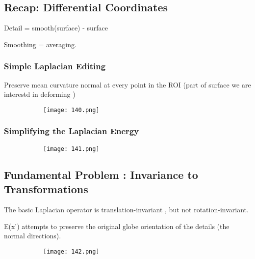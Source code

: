 \documentclass{article}
\begin{document}
\subsection{Recap: Differential Coordinates}

Detail = smooth(surface) - surface

Smoothing = averaging.

\subsubsection{Simple Laplacian Editing}

Preserve mean curvature normal at every point in the ROI (part of surface we are interestd in deforming )

    \begin{figure}[ht!]
  \centering
  \begin{subfigure}[b]{0.5\linewidth}
    \texttt{[image: 140.png]}
  \end{subfigure}
\end{figure}


\subsubsection{Simplifying the Laplacian Energy}


    \begin{figure}[ht!]
  \centering
  \begin{subfigure}[b]{0.8\linewidth}
    \texttt{[image: 141.png]}
  \end{subfigure}
\end{figure}


\subsection{Fundamental Problem : Invariance to Transformations}

The basic Laplacian operator is translation-invariant , but not rotation-invariant.

E(x') attempts to preserve the original globe orientation of the details (the normal directions).


    \begin{figure}[ht!]
  \centering
  \begin{subfigure}[b]{0.7\linewidth}
    \texttt{[image: 142.png]}
  \end{subfigure}
\end{figure}
\end{document}
